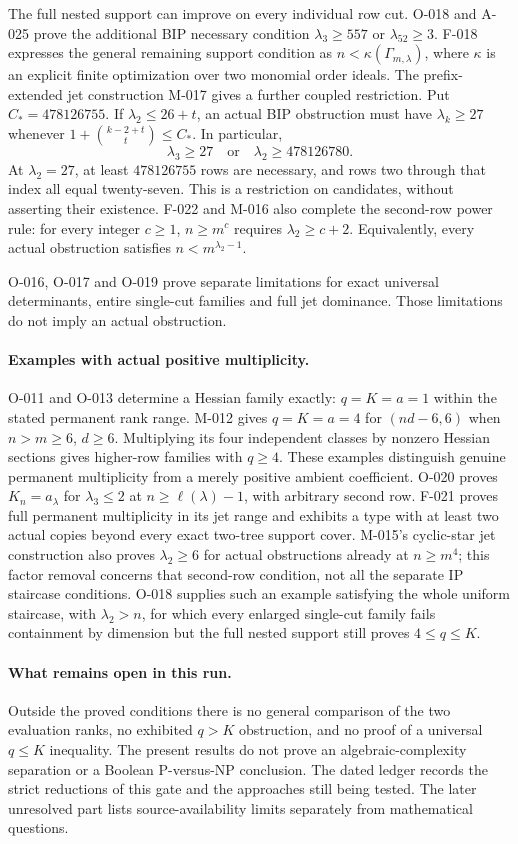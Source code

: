 The full nested support can improve on every individual row cut.
O-018 and A-025 prove the additional BIP necessary condition
\(\lambda_3\geq557\) or \(\lambda_{52}\geq3\).
F-018 expresses the general remaining support condition as
\(n<\kappa(\Gamma_{m,\lambda})\), where \(\kappa\) is an
explicit finite optimization over two monomial order ideals.
The prefix-extended jet construction M-017 gives a further
coupled restriction. Put \(C_*=478126755\). If
\(\lambda_2\leq26+t\), an actual BIP obstruction must have
\(\lambda_k\geq27\) whenever
\(1+\binom{k-2+t}{t}\leq C_*\). In particular,
\[
 \lambda_3\geq27\quad\text{or}\quad\lambda_2\geq478126780.
\]
At \(\lambda_2=27\), at least \(478126755\) rows are
necessary, and rows two through that index all equal twenty-seven.
This is a restriction on candidates, without asserting their existence.
F-022 and M-016 also complete the second-row power rule:
for every integer \(c\geq1\), \(n\geq m^c\) requires
\(\lambda_2\geq c+2\). Equivalently, every actual obstruction
satisfies \(n<m^{\lambda_2-1}\).

O-016, O-017 and O-019 prove separate limitations for exact
universal determinants, entire single-cut families and full jet
dominance. Those limitations do not imply an actual obstruction.

\paragraph{Examples with actual positive multiplicity.}
O-011 and O-013 determine a Hessian family exactly:
\(q=K=a=1\) within the stated permanent rank range.
M-012 gives \(q=K=a=4\) for \((nd-6,6)\) when
\(n>m\geq6\), \(d\geq6\). Multiplying its four independent
classes by nonzero Hessian sections gives higher-row families
with \(q\geq4\). These examples distinguish genuine
permanent multiplicity from a merely positive ambient coefficient.
O-020 proves \(K_n=a_\lambda\) for \(\lambda_3\leq2\)
at \(n\geq\ell(\lambda)-1\), with arbitrary second row.
F-021 proves full permanent multiplicity in its jet range and
exhibits a type with at least two actual copies beyond every
exact two-tree support cover. M-015's cyclic-star jet construction
also proves \(\lambda_2\geq6\) for actual obstructions already
at \(n\geq m^4\); this factor removal concerns that second-row
condition, not all the separate IP staircase conditions.
O-018 supplies such an example satisfying the whole uniform
staircase, with \(\lambda_2>n\), for which every enlarged
single-cut family fails containment by dimension but the full
nested support still proves \(4\leq q\leq K\).

\paragraph{What remains open in this run.}
Outside the proved conditions there is no general comparison
of the two evaluation ranks, no exhibited \(q>K\) obstruction,
and no proof of a universal \(q\leq K\) inequality. The present
results do not prove an algebraic-complexity separation or a
Boolean P-versus-NP conclusion. The dated ledger records the
strict reductions of this gate and the approaches still being
tested. The later unresolved part lists source-availability
limits separately from mathematical questions.
\clearpage
